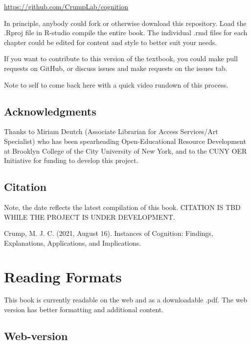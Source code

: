 \documentclass[
  oneside,
  12pt]{crumpbook}
\begin{document}
\url{https://github.com/CrumpLab/cognition}

In principle, anybody could fork or otherwise download this repository. Load the .Rproj file in R-studio compile the entire book. The individual .rmd files for each chapter could be edited for content and style to better suit your needs.

If you want to contribute to this version of the textbook, you could make pull requests on GitHub, or discuss issues and make requests on the issues tab.

Note to self to come back here with a quick video rundown of this process.

\hypertarget{acknowledgments}{%
\section{Acknowledgments}\label{acknowledgments}}

Thanks to Miriam Deutch (Associate Librarian for Access Services/Art Specialist) who has been spearheading Open-Educational Resource Development at Brooklyn College of the City University of New York, and to the CUNY OER Initiative for funding to develop this project.

\hypertarget{citation}{%
\section{Citation}\label{citation}}

Note, the date reflects the latest compilation of this book. CITATION IS TBD WHILE THE PROJECT IS UNDER DEVELOPMENT.

Crump, M. J. C. (2021, August 16). Instances of Cognition: Findings, Explanations, Applications, and Implications.

\hypertarget{reading-formats}{%
\chapter*{Reading Formats}\label{reading-formats}}

This book is currently readable on the web and as a downloadable .pdf. The web version has better formatting and additional content.

\hypertarget{web-version}{%
\section{Web-version}\label{web-version}}
\end{document}
